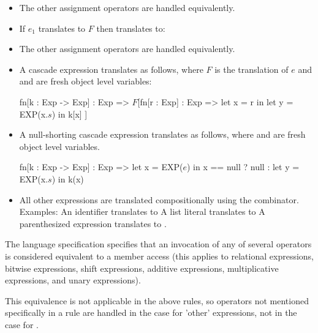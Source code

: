 \documentclass[makeidx]{article}
\begin{document}
{\begin{itemize}
\item The other assignment operators are handled equivalently.
\item If $e_1$ translates to $F$ then  translates to:
\item The other assignment operators are handled equivalently.
\item A cascade expression  translates as follows, where $F$ is the
  translation of $e$ and   and  are fresh object level variables:
  \begin{dartCode}
    fn[k : Exp -> Exp] : Exp =>
       $F$[fn[r : Exp] : Exp => let x = r in
                              let y = EXP(x.$s$)
                              in k[x]
       ]
  \end{dartCode}
\item A null-shorting cascade expression  translates as follows, where 
  and  are fresh object level variables.
  \begin{dartCode}
     fn[k : Exp -> Exp] : Exp =>
         let x = EXP($e$) in x == null ? null : let y = EXP(x.$s$) in k(x)
  \end{dartCode}
\item All other expressions are translated compositionally using the 
  combinator.  Examples:
  An identifier  translates to 
  A list literal \code{[$e_1$, \ldots, $e_n$]} translates to 
  A parenthesized expression  translates to .
\end{itemize}

The language specification specifies that an invocation of any of several
operators is considered equivalent to a member access (this applies to
relational expressions, bitwise expressions, shift expressions, additive
expressions, multiplicative expressions, and unary expressions).


This equivalence is not applicable in the above rules, so operators not
mentioned specifically in a rule are handled in the case for 'other'
expressions, not in the case for .

}
\end{document}
